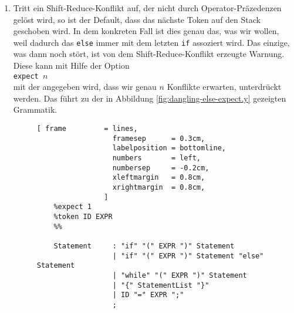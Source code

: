 \begin{enumerate}
\item Tritt ein Shift-Reduce-Konflikt auf, der nicht durch Operator-Pr\"azedenzen gel\"ost wird,
      so ist der Default, dass das n\"achste Token auf den Stack geschoben wird.  In dem konkreten
      Fall ist dies genau das, was wir wollen, weil dadurch das \texttt{else} immer mit dem letzten
      \texttt{if} assoziert wird.  Das einzige, was dann noch st\"ort, ist von dem
      Shift-Reduce-Konflikt erzeugte Warnung.  Diese kann mit Hilfe der Option
      \\[0.2cm]
      \hspace*{1.3cm}
      \texttt{expect $n$}
      \\[0.2cm]
      mit der angegeben wird, dass wir genau $n$ Konflikte erwarten, unterdr\"uckt werden.
      Das f\"uhrt zu der in Abbildung \ref{fig:dangling-else-expect.y} gezeigten Grammatik.

      \begin{figure}[!ht]
\centering
\begin{Verbatim}[ frame         = lines, 
                  framesep      = 0.3cm, 
                  labelposition = bottomline,
                  numbers       = left,
                  numbersep     = -0.2cm,
                  xleftmargin   = 0.8cm,
                  xrightmargin  = 0.8cm,
                ]
    %expect 1
    %token ID EXPR 
    %%
    
    Statement     : "if" "(" EXPR ")" Statement 
                  | "if" "(" EXPR ")" Statement "else" Statement
                  | "while" "(" EXPR ")" Statement 
                  | "{" StatementList "}"
                  | ID "=" EXPR ";"
                  ;
    

\end{Verbatim}
\end{figure}
\end{enumerate}
